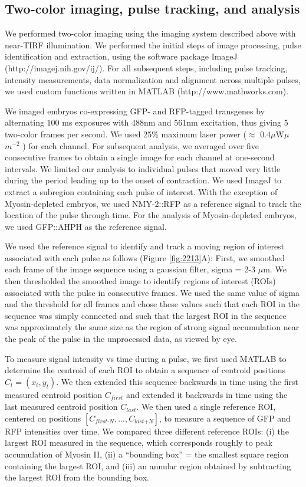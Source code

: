 \subsection{Two-color imaging, pulse tracking, and analysis}
We performed two-color imaging using the imaging system described above with near-TIRF illumination. We performed the initial steps of image processing, pulse identification and extraction, using the software package ImageJ (http://imagej.nih.gov/ij/). For all subsequent steps, including pulse tracking,  intensity measurements, data normalization and alignment across multiple pulses, we used custom functions written in MATLAB (http://www.mathworks.com).


We imaged embryos co-expressing GFP- and RFP-tagged transgenes by alternating 100 ms exposures with 488nm and 561nm excitation,  thus giving 5 two-color frames per second. We used 25$\%$ maximum laser power ($\approx$ 0.4$\mu$W$\mu$ $m^{-2}$ ) for each channel. For subsequent analysis,  we averaged over five consecutive frames to obtain a single image for each channel at one-second intervals. We limited our analysis to individual pulses that moved very little during the period leading up to the onset of contraction. We used ImageJ to extract a subregion containing each pulse of interest. With the exception of Myosin-depleted embryos, we used NMY-2::RFP as a reference signal to track the location of the pulse through time. For the analysis of Myosin-depleted embryos, we used GFP::AHPH as the reference signal.


We used the reference signal to identify and track a moving region of interest associated with each pulse as follows (Figure \ref{fig:2213}A):  First, we smoothed each frame of the image sequence using a gaussian filter, sigma = 2-3 $\mu$m. We then thresholded the smoothed image to identify regions of interest (ROIs) associated with the pulse in consecutive frames. We used the same value of sigma and the threshold for all frames and chose these values such that each ROI in the sequence was simply connected and such that the largest ROI in the sequence was approximately the same size as the region of strong signal accumulation near the peak of the pulse in the unprocessed data, as viewed by eye.  





To measure signal intensity vs time during a pulse, we first used MATLAB to determine the centroid of each ROI to obtain a sequence of centroid positions $C_{t} = (x_{t},y_{t})$.  We then extended this sequence backwards in time using the first measured centroid position $C_{\textit{first}}$ and extended it backwards in time using the last measured centroid position $C_{\textit{last}}$.  We then used a single reference ROI, centered on positions $[C_{\textit{first-N}},...,C_{\textit{last+N}}]$, to measure a sequence of GFP and RFP intensities over time.  We compared three different reference ROIs: (i) the largest ROI measured in the sequence, which corresponds roughly to peak accumulation of Myosin II, (ii)  a ``bounding box'' = the smallest square region containing the largest ROI, and (iii) an annular region obtained by subtracting the largest ROI from the bounding box.


